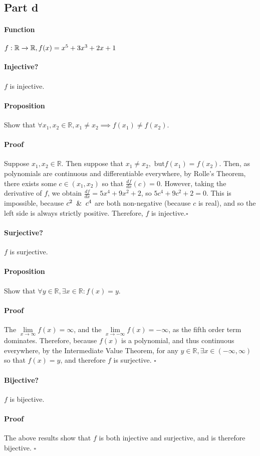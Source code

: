 \documentclass{article}
\begin{document}
\subsection{Part d}
{
\paragraph{Function}$f:\mathbb{R}\xrightarrow{}\mathbb{R}, f(x)=x^5+3x^3+2x+1$
{
\paragraph{Injective?}
$f$ is injective.
\vspace{-10pt}
\paragraph{Proposition}
Show that $\forall x_1, x_2 \in \mathbb{R}, x_1 \neq x_2 \implies f(x_1) \neq f(x_2)$.
\vspace{-10pt}
\paragraph{Proof}
Suppose $x_1, x_2 \in \mathbb{R}$. Then suppose that $x_1\neq x_2,\textrm{ but} f(x_1)=f(x_2).$ Then, as polynomials are continuous and differentiable everywhere, by Rolle's Theorem, there exists some $c \in (x_1, x_2)$ so that $\frac{df}{dx}(c) = 0$. However, taking the derivative of $f$, we obtain $\frac{df}{dx}=5x^4+9x^2+2$, so $5c^4+9c^2+2=0$. This is impossible, because $c^2 \And c^4$ are both non-negative (because $c$ is real), and so the left side is always strictly positive. Therefore, $f$ is injective.$\square$
}
{
\paragraph{Surjective?}
$f$ is surjective.
\vspace{-10pt}
\paragraph{Proposition}
Show that $\forall y \in \mathbb{R}, \exists x \in \mathbb{R} : f(x) = y$.
\vspace{-10pt}
\paragraph{Proof}
The $\lim\limits_{x \to \infty}f(x) = \infty$, and the $\lim\limits_{x \to -\infty}f(x) = -\infty$, as the fifth order term dominates. Therefore, because $f(x)$ is a polynomial, and thus continuous everywhere, by the Intermediate Value Theorem, for any $y \in \mathbb{R}, \exists x \in (-\infty, \infty)$ so that $f(x) = y$, and therefore $f$ is surjective. $\square$
}
{
\paragraph{Bijective?}
$f$ is bijective.
\vspace{-10pt}
\paragraph{Proof}
The above results show that $f$ is both injective and surjective, and is therefore bijective. $\square$
}
}
\end{document}
